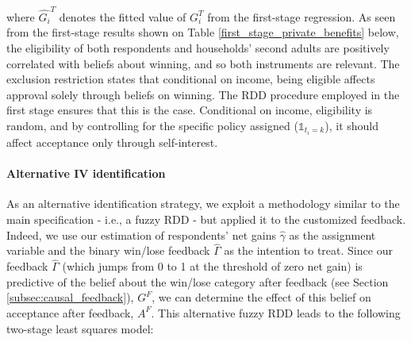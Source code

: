 \documentclass[12pt]{article} %
\newcommand{\un}{\mathds{1}} %
\begin{document}
\medskip


\noindent
where $\widehat{G_i}^T$ denotes the fitted value of $G_i^T$ from the first-stage regression. As seen from the first-stage results shown on Table \ref{first_stage_private_benefits} below, the eligibility of both respondents and households' second adults are positively correlated with beliefs about winning, and so both instruments are relevant. The exclusion restriction states that conditional on income, being eligible affects approval solely through beliefs on winning. The RDD procedure employed in the first stage ensures that this is the case. Conditional on income, eligibility is random, and by controlling for the specific policy assigned ($\un_{t_i=k}$), it should affect acceptance only through self-interest. 

\paragraph{Alternative IV identification}
As an alternative identification strategy, we exploit a methodology similar to the main specification - i.e., a fuzzy RDD - but applied it to the customized feedback. Indeed, we use our estimation of respondents' net gains $\widehat{\gamma}$ as the assignment variable and the binary win/lose feedback $\widehat{\Gamma}$ as the intention to treat. Since our feedback $\widehat{\Gamma}$ (which jumps from 0 to 1 at the threshold of zero net gain) is predictive of the belief about the win/lose category after feedback (see Section \ref{subsec:causal_feedback}), $G^F$, we can determine the effect of this belief on acceptance after feedback, $A^F$. This alternative fuzzy RDD leads to the following two-stage least squares model:


\end{document}
